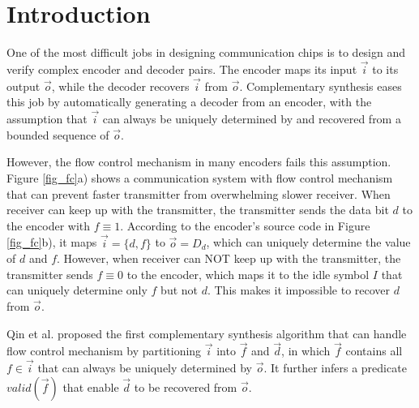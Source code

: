 \documentclass[conference]{IEEEtran}
\begin{document}
\section{Introduction}\label{sec_intro}
One of the most difficult jobs in designing communication
 chips is to design and verify complex encoder and decoder pairs.
The encoder maps its input $\vec{i}$ to its output  $\vec{o}$,
while the decoder recovers $\vec{i}$ from $\vec{o}$.
Complementary synthesis 
\cite{ShenICCAD09,ShenTCAD11,ShenTCAD12,LiuICCAD11,LiuTCAD12,TuDAC13}
eases this job by
automatically generating a decoder from an encoder,
with the assumption that $\vec{i}$ can always be
uniquely determined by and recovered from a bounded sequence of $\vec{o}$.

However,
the flow control mechanism \cite{flowcontrol} in many encoders
fails this assumption.
Figure \ref{fig_fc}a) shows a communication system with flow control mechanism 
that can prevent faster transmitter from overwhelming slower receiver.
When receiver can keep up with the transmitter,
the transmitter sends the data bit $d$ to the encoder with $f\equiv 1$.
According to the encoder's source code in Figure \ref{fig_fc}b),
it maps $\vec{i}=\{d,f\}$ to $\vec{o}=D_d$,
which can uniquely determine the value of $d$ and $f$.
However,
when receiver can NOT keep up with the transmitter,
the transmitter sends $f\equiv 0$ to the encoder,
which maps it to the idle symbol $I$ that can uniquely determine only $f$ but not $d$.
This makes it impossible to recover $d$ from $\vec{o}$.

Qin et al. \cite{QinTODAES15} proposed the first complementary synthesis algorithm 
that can handle flow control mechanism by
partitioning $\vec{i}$ into $\vec{f}$ and $\vec{d}$,
in which $\vec{f}$ contains all $f\in \vec{i}$ that can always be uniquely determined by $\vec{o}$.
It further infers a predicate $valid(\vec{f})$ that
enable $\vec{d}$ to be recovered from $\vec{o}$.
\end{document}

